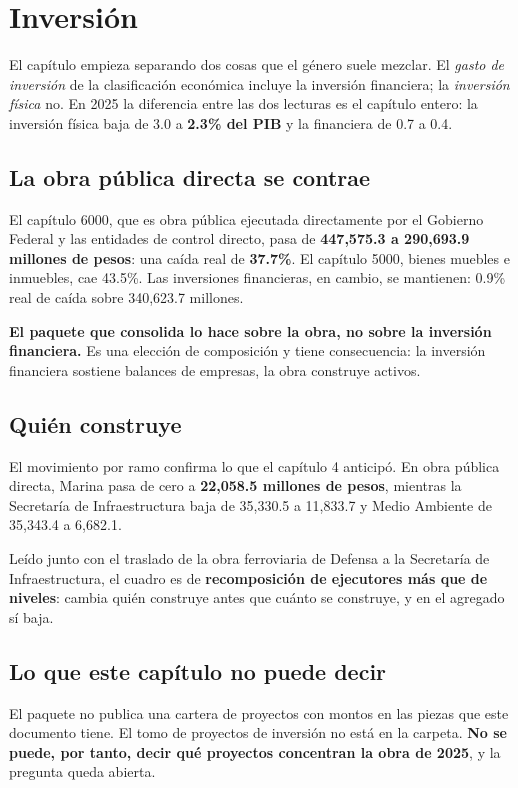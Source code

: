 \chapter{Inversión}

El capítulo empieza separando dos cosas que el género suele mezclar. El
\emph{gasto de inversión} de la clasificación económica incluye la inversión
financiera; la \emph{inversión física} no. En 2025 la diferencia entre las dos
lecturas es el capítulo entero: la inversión física baja de 3.0 a \textbf{2.3\%
del PIB} y la financiera de 0.7 a 0.4.



\section{La obra pública directa se contrae}

El capítulo 6000, que es obra pública ejecutada directamente por el Gobierno
Federal y las entidades de control directo, pasa de \textbf{447,575.3 a 290,693.9
millones de pesos}: una caída real de \textbf{37.7\%}. El capítulo 5000, bienes
muebles e inmuebles, cae 43.5\%. Las inversiones financieras, en cambio, se
mantienen: 0.9\% real de caída sobre 340,623.7 millones.

\textbf{El paquete que consolida lo hace sobre la obra, no sobre la inversión
financiera.} Es una elección de composición y tiene consecuencia: la inversión
financiera sostiene balances de empresas, la obra construye activos.

\section{Quién construye}

El movimiento por ramo confirma lo que el capítulo 4 anticipó. En obra pública
directa, Marina pasa de cero a \textbf{22,058.5 millones de pesos}, mientras la
Secretaría de Infraestructura baja de 35,330.5 a 11,833.7 y Medio Ambiente de
35,343.4 a 6,682.1.

Leído junto con el traslado de la obra ferroviaria de Defensa a la Secretaría de
Infraestructura, el cuadro es de \textbf{recomposición de ejecutores más que de
niveles}: cambia quién construye antes que cuánto se construye, y en el agregado
sí baja.

\section{Lo que este capítulo no puede decir}

El paquete no publica una cartera de proyectos con montos en las piezas que este
documento tiene. El tomo de proyectos de inversión no está en la carpeta.
\textbf{No se puede, por tanto, decir qué proyectos concentran la obra de 2025}, y
la pregunta queda abierta.

\clearpage
